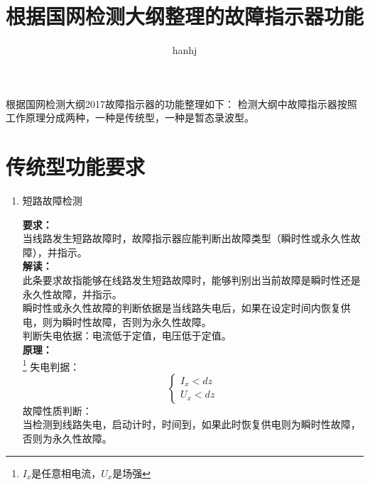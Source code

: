 \documentclass{article}
\begin{document}
\begin{CJK}{UTF8}{gbsn}
\title{根据国网检测大纲整理的故障指示器功能}
\author{hanhj}
\maketitle
根据国网检测大纲2017故障指示器的功能整理如下：
检测大纲中故障指示器按照工作原理分成两种，一种是传统型，一种是暂态录波型。
\section{传统型功能要求}
\begin{enumerate}
\item	短路故障检测
\par
	\textbf{要求：}\\当线路发生短路故障时，故障指示器应能判断出故障类型（瞬时性或永久性故障），并指示。\\
	\textbf{解读：}\\此条要求故指能够在线路发生短路故障时，能够判别出当前故障是瞬时性还是永久性故障，并指示。\\
	瞬时性或永久性故障的判断依据是当线路失电后，如果在设定时间内恢复供电，则为瞬时性故障，否则为永久性故障。\\
	判断失电依据：电流低于定值，电压低于定值。\\
	\textbf{原理：}\\
	\footnote{$I_x$是任意相电流，$U_x$是场强}
	失电判据：\\
	\[
		\left\{ 
			\begin{array}{ll}
				I_x<dz\\
				U_x<dz 
			\end{array}
		\right.
	\]
	故障性质判断：\\
		当检测到线路失电，启动计时，时间到，如果此时恢复供电则为瞬时性故障，否则为永久性故障。			


\end{enumerate}
\end{CJK}
\end{document}

